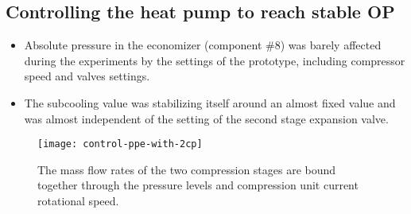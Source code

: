 \subsection{Controlling the heat pump to reach stable OP}
\label{sec:awp-issue-control}

\begin{itemize}
\item Absolute pressure in the economizer (component
  \#8) was barely affected during the experiments by
  the settings of the prototype, including compressor speed and valves
  settings.
\item The subcooling value was stabilizing itself around an almost
  fixed value and was almost independent of the setting of the second
  stage expansion valve.
\end{itemize}

\begin{figure}[htbp]
  \centering
  \texttt{[image: control-ppe-with-2cp]}
  \caption[The flow rates of the compression stages are bound
  together]{The mass flow rates of the two compression stages are
    bound together through the pressure levels and compression unit
    current rotational speed. }
  \label{fig:awp-control-ppe-2cp}
\end{figure}

